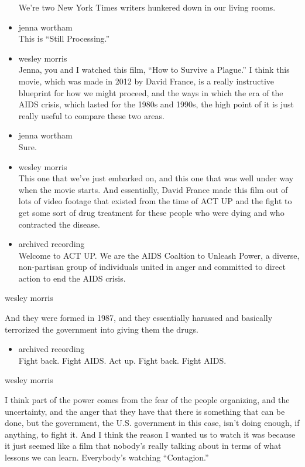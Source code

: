 \begin{itemize}
  We're two New York Times writers hunkered down in our living rooms.
\item
  jenna wortham\\
  This is ``Still Processing.''
\item
  wesley morris\\
  Jenna, you and I watched this film, ``How to Survive a Plague.'' I
  think this movie, which was made in 2012 by David France, is a really
  instructive blueprint for how we might proceed, and the ways in which
  the era of the AIDS crisis, which lasted for the 1980s and 1990s, the
  high point of it is just really useful to compare these two areas.
\item
  jenna wortham\\
  Sure.
\item
  wesley morris\\
  This one that we've just embarked on, and this one that was well under
  way when the movie starts. And essentially, David France made this
  film out of lots of video footage that existed from the time of ACT UP
  and the fight to get some sort of drug treatment for these people who
  were dying and who contracted the disease.
\item
  archived recording\\
  Welcome to ACT UP. We are the AIDS Coaltion to Unleash Power, a
  diverse, non-partisan group of individuals united in anger and
  committed to direct action to end the AIDS crisis.
\end{itemize}

wesley morris

And they were formed in 1987, and they essentially harassed and
basically terrorized the government into giving them the drugs.

\begin{itemize}
\tightlist
\item
  archived recording\\
  Fight back. Fight AIDS. Act up. Fight back. Fight AIDS.
\end{itemize}

wesley morris

I think part of the power comes from the fear of the people organizing,
and the uncertainty, and the anger that they have that there is
something that can be done, but the government, the U.S. government in
this case, isn't doing enough, if anything, to fight it. And I think the
reason I wanted us to watch it was because it just seemed like a film
that nobody's really talking about in terms of what lessons we can
learn. Everybody's watching ``Contagion.''

